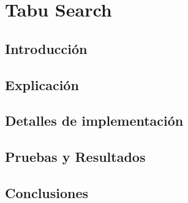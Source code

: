 \section {Tabu Search}
\subsection{Introducción}


\subsection{Explicación}


\subsection{Detalles de implementación}


\subsection{Pruebas y Resultados}


\subsection{Conclusiones}

